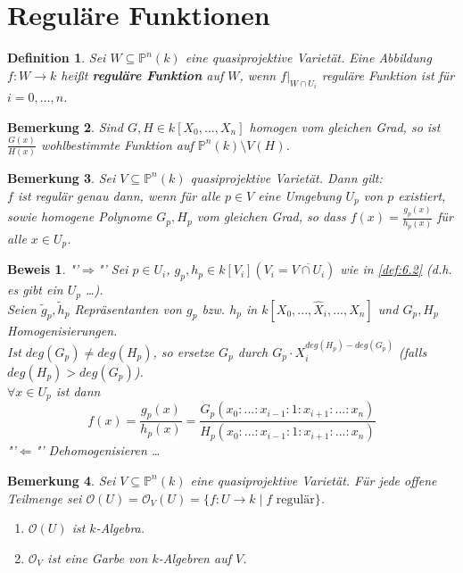 \documentclass[a4paper,12pt]{report}
\theoremstyle{break}
\newtheorem{Def}{Definition}[section]
\newtheorem{Bem}[Def]{Bemerkung}
\theoremstyle{nonumberbreak}
\theoremstyle{nonumberplain}
\newtheorem{Bew}{Beweis}
\newcommand{\emp}[1]{\textbf{\emph{#1}}}
\newcommand{\begriff}[1]{{\index{#1}}\emp{#1}}
\begin{document}
\section{Reguläre Funktionen}
\begin{Def}
\label{def:10.1}
Sei $W\subseteq\mathbb{P}^n(k)$ eine quasiprojektive Varietät. Eine Abbildung $f:W\rightarrow k$ heißt \begriff{reguläre Funktion} auf $W$, wenn $f|_{W\cap U_i}$ reguläre Funktion ist für $i=0,\dots,n$.
\end{Def}
\begin{Bem}
\label{bem:10.2}
Sind $G,H\in k[X_0,...,X_n]$ homogen vom gleichen Grad, so ist $\frac{G(x)}{H(x)}$ wohlbestimmte Funktion auf $\mathbb{P}^n(k)\setminus V(H)$.
\end{Bem}

\begin{Bem}
\label{bem:10.3}
Sei $V\subseteq\mathbb{P}^n(k)$ quasiprojektive Varietät. Dann gilt:\\
$f$ ist regulär genau dann, wenn für alle $p\in V$ eine Umgebung $U_p$ von $p$ existiert, sowie homogene Polynome $G_p, H_p$ vom gleichen Grad, so dass $f(x)=\frac{g_p(x)}{h_p(x)}$ für alle $x\in U_p$.
\end{Bem}

\begin{Bew} "'$\Rightarrow$"' Sei $p\in U_i$, $g_p,h_p\in k[V_i](V_i=\overline{V\cap U_i})$ wie in \ref{def:6.2} (d.h. es gibt ein $U_p$ \dots).\\
Seien $\tilde{g}_p, \tilde{h}_p$ Repräsentanten von $g_p$ bzw. $h_p$ in $k[X_0,...,\hat{X}_i,...,X_n]$ und $G_p, H_p$ Homogenisierungen.\\
Ist $deg(G_p)\neq deg(H_p)$, so ersetze $G_p$ durch $G_p\cdot X_i^{deg(H_p)-deg(G_p)}$ (falls $deg(H_p)>deg(G_p)$).\\
$\forall x\in U_p$ ist dann $$f(x)=\frac{g_p(x)}{h_p(x)}=\frac{G_p(x_0:...:x_{i-1}:1:x_{i+1}:...:x_n)}{H_p(x_0:...:x_{i-1}:1:x_{i+1}:...:x_n)}$$
"'$\Leftarrow$"' Dehomogenisieren \dots
\end{Bew}
\begin{Bem}
Sei $V\subseteq\mathbb{P}^n(k)$ eine quasiprojektive Varietät. Für jede offene Teilmenge sei $\mathcal{O}(U)=\mathcal{O}_V(U)=\{f: U\rightarrow k \mid f \text{ regulär} \}$.\\
\begin{enumerate}
\item $\mathcal{O}(U)$ ist $k$-Algebra.\\
\item $\mathcal{O}_V$ ist eine Garbe von $k$-Algebren auf $V$.
\end{enumerate}
\end{Bem}
\end{document}
